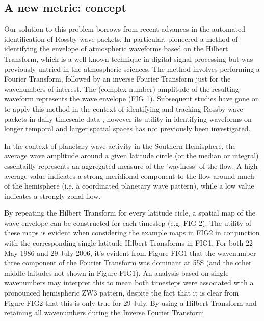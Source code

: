 \subsection{A new metric: concept}

Our solution to this problem borrows from recent advances in the automated identification of Rossby wave packets. In particular, \citet{Zimin2003} pioneered a method of identifying the envelope of atmospheric waveforms based on the Hilbert Transform, which is a well known technique in digital signal processing but was previously untried in the atmospheric sciences. The method involves performing a Fourier Transform, followed by an inverse Fourier Transform just for the wavenumbers of interest. The (complex number) amplitude of the resulting waveform represents the wave envelope (FIG 1). Subsequent studies have gone on to apply this method in the context of identifying and tracking Rossby wave packets in daily timescale data \citep{Glatt2014,Souders2014a}, however its utility in identifying waveforms on longer temporal and larger spatial spaces has not previously been investigated.

In the context of planetary wave activity in the Southern Hemisphere, the average wave amplitude around a given latitude circle (or the median or integral) essentailly represents an aggregated measure of the 'waviness' of the flow. A high average value indicates a strong meridional component to the flow around much of the hemisphere (i.e. a coordinated planetary wave pattern), while a low value indicates a strongly zonal flow. 

By repeating the Hilbert Transform for every latitude cicle, a spatial map of the wave envelope can be constructed for each timestep (e.g. FIG 2). The utility of these maps is evident when considering the example maps in FIG2 in conjunction with the corresponding single-latitude Hilbert Transforms in FIG1. For both 22 May 1986 and 29 July 2006, it's evident from Figure FIG1 that the wavenumber three component of the Fourier Transform was dominant at 55S (and the other middle laitudes not shown in Figure FIG1). An analysis based on single wavenumbers may interpret this to mean both timesteps were associated with a pronounced hemispheric ZW3 pattern, despite the fact that it is clear from Figure FIG2 that this is only true for 29 July. By using a Hilbert Transform and retaining all wavenumbers during the Inverse Fourier Transform
